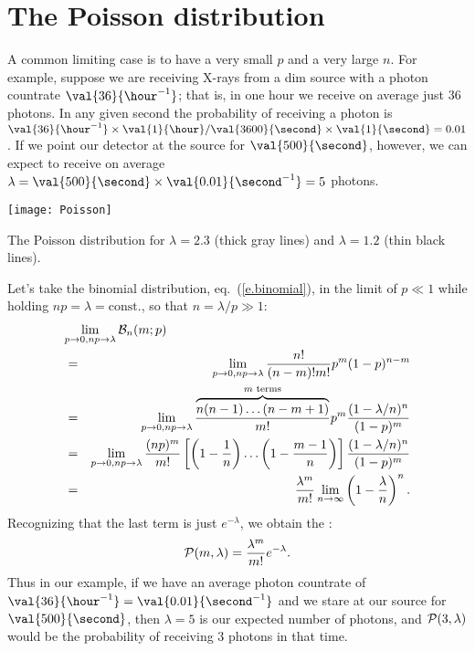 \section{The Poisson distribution}

A common limiting case is to have a very small $p$ and a very large $n$. For example, suppose we are receiving X-rays from a dim source with a photon countrate $\val{36}{\hour^{-1}}$; that is, in one hour we receive on average just 36 photons.  In any given second the probability of receiving a photon is $\val{36}{\hour^{-1}}\times \val{1}{\hour}/\val{3600}{\second}\times \val{1}{\second} = 0.01$.  If we point our detector at the source for $\val{500}{\second}$, however, we can expect to receive on average $\lambda = \val{500}{\second}\times\val{0.01}{\second^{-1}} = 5$ photons.

\begin{marginfigure}
\texttt{[image: Poisson]}
\caption[The Poisson distribution ]{The Poisson distribution for $\lambda=2.3$ (thick gray lines) and $\lambda=1.2$ (thin black lines).}
\label{f.Poisson}
\end{marginfigure}

Let's take the binomial distribution, eq.~(\ref{e.binomial}), in the limit of $p\ll 1$ while holding $np=\lambda=\mathrm{const.}$, so that $n = \lambda/p \gg 1$:
\begin{eqnarray*}
	\lefteqn{\lim_{p\to 0,np\to\lambda}\binom{n}{m}{p}}\\
	 &=& \lim_{p\to 0,np\to\lambda} \frac{n!}{(n-m)!m!} p^{m} (1-p)^{n-m}\\
	&=& \lim_{p\to 0,np\to\lambda} \frac{\overbrace{n(n-1)\ldots(n-m+1)}^{\textrm{$m$ terms}}}{m!}p^{m}\frac{(1-\lambda/n)^{n}}{(1-p)^{m}}\\
	&=& \lim_{p\to 0,np\to\lambda} \frac{(np)^{m}}{m!}\left[\left(1-\frac{1}{n}\right)\ldots\left(1-\frac{m-1}{n}\right)\right]\frac{(1-\lambda/n)^{n}}{(1-p)^{m}}\\
	&=& \frac{\lambda^{m}}{m!}\lim_{n\to\infty}\left(1-\frac{\lambda}{n}\right)^{n}.
\end{eqnarray*}
Recognizing that the last term is just $e^{-\lambda}$, we obtain the :
\begin{equation}\label{e.Poisson}
	\mathcal{P}(m,\lambda) = \frac{\lambda^{m}}{m!}e^{-\lambda}.
\end{equation}
Thus in our example, if we have an average photon countrate of $\val{36}{\hour^{-1}} = \val{0.01}{\second^{-1}}$ and we stare at our source for $\val{500}{\second}$, then $\lambda = 5$ is our expected number of photons, and $\mathcal{P}(3,\lambda)$ would be the probability of receiving 3 photons in that time.

